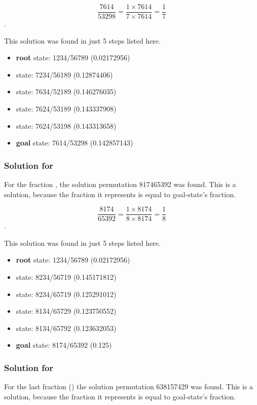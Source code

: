 \documentclass{article}
\begin{document}
\[\frac{7614}{53298} = \frac{1 \times 7614}{7 \times 7614} = \frac{1}{7}\].

This solution was found in just 5 steps listed here.

\begin{itemize}
  \item \textbf{root} state: 1234/56789 (0.02172956) 
  \item state: 7234/56189 (0.12874406)
  \item state: 7634/52189 (0.146276035)
  \item state: 7624/53189 (0.143337908)
  \item state: 7624/53198 (0.143313658)
  \item \textbf{goal} state: 7614/53298 (0.142857143)
\end{itemize}

\subsubsection{Solution for }

For the fraction , the solution permutation 817465392 was
found. This is a solution, because the fraction it represents is equal to
goal-state's fraction.

\[\frac{8174}{65392} = \frac{1 \times 8174}{8 \times 8174} = \frac{1}{8}\].

This solution was found in just 5 steps listed here.

\begin{itemize}
  \item \textbf{root} state: 1234/56789 (0.02172956) 
  \item state: 8234/56719 (0.145171812)
  \item state: 8234/65719 (0.125291012)
  \item state: 8134/65729 (0.123750552)
  \item state: 8134/65792 (0.123632053)
  \item \textbf{goal} state: 8174/65392 (0.125)
\end{itemize}


\subsubsection{Solution for }

For the last fraction () the solution permutation 638157429 was
found. This is a solution, because the fraction it represents is equal to
goal-state's fraction.
\end{document}
